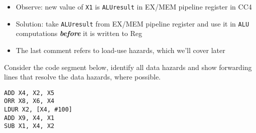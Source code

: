 \begin{frame}[fragile]
	
 \begin{figure}[H]
\centering
\end{figure}
\begin{itemize}
\item Observe: new value of {\tt X1} is {\tt ALUresult} in EX/MEM pipeline register in CC4 

\item Solution: take {\tt ALUresult} from EX/MEM pipeline register and use it in {\tt ALU} computations
  {\em \textbf{before}} it is written to Reg
  
\end{itemize}
\BNotes\ifnum{}

\begin{itemize}
  \item The last comment refers to load-use hazards, which we'll cover later
  \end{itemize}
\fi\ENotes
\end{frame}

\begin{frame}[fragile]
    \begin{tcolorbox}[enhanced,attach boxed title to top center={yshift=-3mm,yshifttext=-1mm},
  colback=red!5!white,colframe=red!75!black,colbacktitle=red!80!black,
  title=Try this,fonttitle=\bfseries,
  boxed title style={size=small,colframe=red!50!black} ]
 Consider the code segment below, identify all data hazards and show forwarding lines that resolve the data hazards, where possible.
  \begin{verbatim}
ADD X4, X2, X5   
ORR X8, X6, X4
LDUR X2, [X4, #100]
ADD X9, X4, X1
SUB X1, X4, X2
\end{verbatim}
  \end{tcolorbox}
\end{frame}


